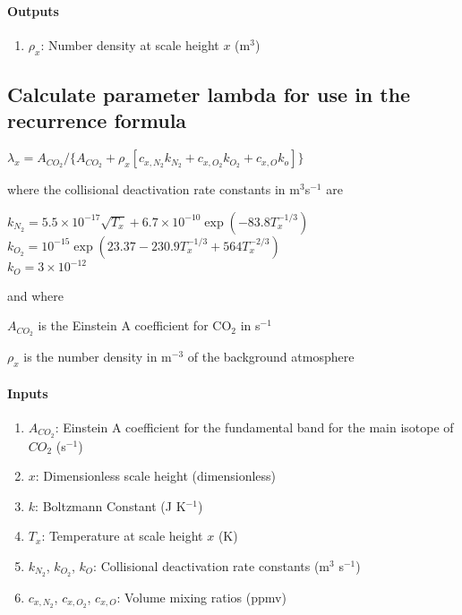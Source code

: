    \paragraph{Outputs}
   \begin{enumerate}
   \item $\rho_x$: Number density at scale height $x$ (m$^3$)
   \end{enumerate}

\subsection{Calculate parameter lambda for use in the recurrence 
  formula}
  
   $\lambda_x = A_{CO_2} / \{ A_{CO_2} + \rho_x[c_{x,N_2}k_{N_2} + c_{x,O_2}k_{O_2} + c_{x,O}k_o ] \}$

   \noindent where the collisional deactivation rate constants in m$^3$s$^{-1}$ are

   \noindent $k_{N_2} = 5.5 \times 10^{-17} \sqrt{T_x} + 6.7 \times 10^{-10} \exp(-83.8T_x^{-1/3})$ \\
   \noindent $k_{O_2} = 10^{-15} \exp(23.37 - 230.9T_x^{-1/3} + 564T_x^{-2/3})$ \\
   \noindent $k_O = 3 \times 10^{-12}$
   
   \noindent and where
   
   \noindent $A_{CO_2}$ is the Einstein A coefficient for CO$_2$ in s$^{-1}$
   
   \noindent $\rho_x$ is the number density in m$^{-3}$ of the background atmosphere

   \paragraph{Inputs}
   \begin{enumerate}
   \item $A_{CO_2}$: Einstein A coefficient for the fundamental band for the 
     main isotope of $CO_2$ (s$^{-1}$)
   \item $x$: Dimensionless scale height (dimensionless)
   \item $k$: Boltzmann Constant (J K$^{-1}$)
   \item $T_x$: Temperature at scale height $x$ (K)
   \item $k_{N_2}$, $k_{O_2}$, $k_O$: Collisional deactivation rate constants 
     (m$^3$ s$^{-1}$)
   \item $c_{x,N_2}$, $c_{x,O_2}$, $c_{x,O}$: Volume mixing ratios (ppmv)
   \end{enumerate}

